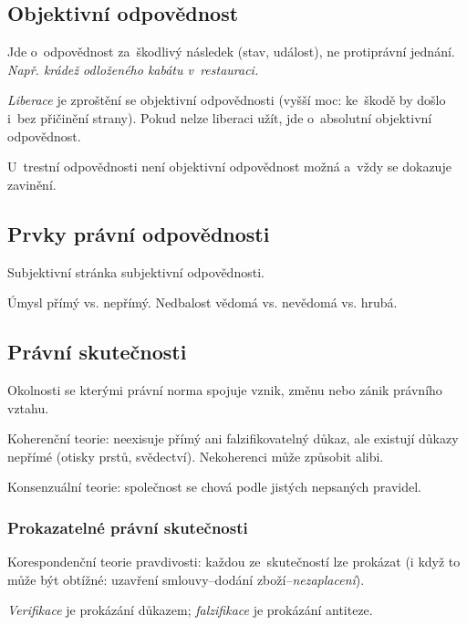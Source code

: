 \subsection{Objektivní odpovědnost}


Jde o~odpovědnost za~škodlivý následek (stav, událost), ne protiprávní jednání.
\emph{Např. krádež odloženého kabátu v~restauraci.}

\emph{Liberace} je zproštění se objektivní odpovědnosti (vyšší moc: ke~škodě by došlo i~bez přičinění strany).
Pokud nelze liberaci užít, jde o~absolutní objektivní odpovědnost.

U~trestní odpovědnosti není objektivní odpovědnost možná a~vždy se dokazuje zavinění.


\subsection{Prvky právní odpovědnosti}

Subjektivní stránka subjektivní odpovědnosti.

Úmysl přímý vs. nepřímý.
Nedbalost vědomá vs. nevědomá vs. hrubá.



\subsection{Právní skutečnosti}

Okolnosti se kterými právní norma spojuje vznik, změnu nebo zánik právního vztahu.

Koherenční teorie: neexisuje přímý ani falzifikovatelný důkaz, ale existují důkazy nepřímé (otisky prstů, svědectví).
Nekoherenci může způsobit alibi.

Konsenzuální teorie: společnost se chová podle jistých nepsaných pravidel.


\subsubsection{Prokazatelné právní skutečnosti}

Korespondenční teorie pravdivosti: každou ze~skutečností lze prokázat (i když to může být obtížné: uzavření smlouvy--dodání zboží--\emph{nezaplacení}).

\emph{Verifikace} je prokázání důkazem; \emph{falzifikace} je prokázání antiteze.


